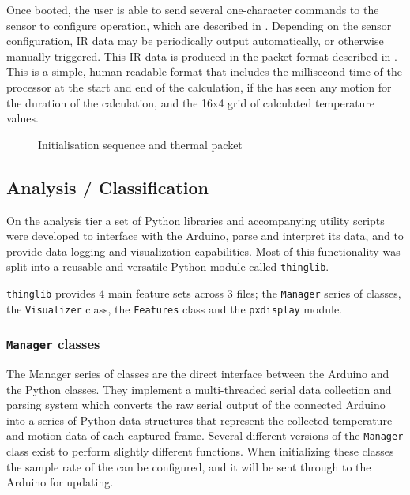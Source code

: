 \documentclass[../thesis/thesis.tex]{subfiles}
\begin{document}
Once booted, the user is able to send several one-character commands to the sensor to configure operation, which are described in . Depending on the sensor configuration, IR data may be periodically output automatically, or otherwise manually triggered. This IR data is produced in the packet format described in . This is a simple, human readable format that includes the millisecond time of the processor at the start and end of the calculation, if the \pir has seen any motion for the duration of the calculation, and the 16x4 grid of calculated temperature values.

\begin{figure}
 \centering

\caption{Initialisation sequence and thermal packet}
\label{fig:code:initseq}
\end{figure}

\subsection{Analysis / Classification}

On the analysis tier a set of Python libraries and accompanying utility scripts were developed to interface with the Arduino, parse and interpret its data, and to provide data logging and visualization capabilities. Most of this functionality was split into a reusable and versatile Python module called \texttt{thinglib}.

\texttt{thinglib} provides 4 main feature sets across 3 files; the \texttt{Manager} series of classes, the \texttt{Visualizer} class, the \texttt{Features} class and the \texttt{pxdisplay} module.

\subsubsection*{\texttt{Manager} classes}
The Manager series of classes are the direct interface between the Arduino and the Python classes. They implement a multi-threaded serial data collection and parsing system which converts the raw serial output of the connected Arduino into a series of Python data structures that represent the collected temperature and motion data of each captured frame. Several different versions of the \texttt{Manager} class exist to perform slightly different functions. When initializing these classes the sample rate of the \mlx can be configured, and it will be sent through to the Arduino for updating.
\end{document}
